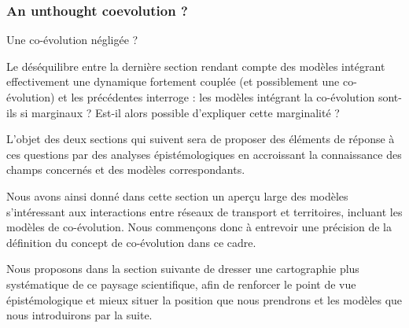 




\subsubsection*{An unthought coevolution ?}{Une co-évolution négligée ?}

Le déséquilibre entre la dernière section rendant compte des modèles intégrant effectivement une dynamique fortement couplée (et possiblement une co-évolution) et les précédentes interroge : les modèles intégrant la co-évolution sont-ils si marginaux ? Est-il alors possible d'expliquer cette marginalité ?


L'objet des deux sections qui suivent sera de proposer des éléments de réponse à ces questions par des analyses épistémologiques en accroissant la connaissance des champs concernés et des modèles correspondants.





\stars


Nous avons ainsi donné dans cette section un aperçu large des modèles s'intéressant aux interactions entre réseaux de transport et territoires, incluant les modèles de co-évolution. Nous commençons donc à entrevoir une précision de la définition du concept de co-évolution dans ce cadre.

Nous proposons dans la section suivante de dresser une cartographie plus systématique de ce paysage scientifique, afin de renforcer le point de vue épistémologique et mieux situer la position que nous prendrons et les modèles que nous introduirons par la suite.


\stars







